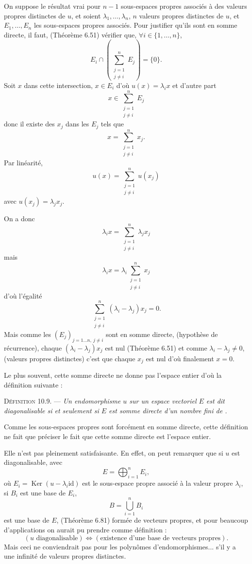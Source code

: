 On suppose le résultat vrai pour $n-1$ sous-espaces propres associés à des valeurs propres distinctes de $u$, et soient $\lambda_1,\ldots,\lambda_n$, $n$ valeurs propres distinctes de $u$, et $E_1,\ldots,E_n$ les sous-espaces propres associés. Pour justifier qu'ils sont en somme directe, il faut, (Théorème 6.51) vérifier que, $\forall i\in\{1,\ldots,n\}$,
\[
E_i\cap\left(\sum_{\substack{j=1\\j\ne i}}^nE_j\right)=\{0\}.
\]
Soit $x$ dans cette intersection, $x\in E_i$ d'où $u(x)=\lambda_ix$ et d'autre part
\[
x\in\sum_{\substack{j=1\\j\ne i}}^nE_j
\]
donc il existe des $x_j$ dans les $E_j$ tels que
\[
x=\sum_{\substack{j=1\\j\ne i}}^nx_j.
\]
Par linéarité,
\[
u(x)=\sum_{\substack{j=1\\j\ne i}}^nu(x_j)
\]
avec $u(x_j)=\lambda_jx_j$.

On a donc
\[
\lambda_ix=\sum_{\substack{j=1\\j\ne i}}^n\lambda_jx_j
\]
mais
\[
\lambda_ix=\lambda_i\sum_{\substack{j=1\\j\ne i}}^nx_j
\]
d'où l'égalité
\[
\sum_{\substack{j=1\\j\ne i}}^n(\lambda_i-\lambda_j)x_j=0.
\]
Mais comme les $(E_j)_{j=1\ldots n,\ j\ne i}$ sont en somme directe, (hypothèse de récurrence), chaque $(\lambda_i-\lambda_j)x_j$ est nul (Théorème 6.51) et comme $\lambda_i-\lambda_j\ne0$, (valeurs propres distinctes) c'est que chaque $x_j$ est nul d'où finalement $x=0$. \bookend

Le plus souvent, cette somme directe ne donne pas l'espace entier d'où la définition suivante :

\medskip\noindent\textsc{Définition 10.9.} --- \emph{Un endomorphisme $u$ sur un espace vectoriel $E$ est dit diagonalisable si et seulement si $E$ est somme directe d'un nombre fini de .}

Comme les sous-espaces propres sont forcément en somme directe, cette définition ne fait que préciser le fait que cette somme directe est l'espace entier.

Elle n'est pas pleinement satisfaisante. En effet, on peut remarquer que si $u$ est diagonalisable, avec
\[
E=\bigoplus_{i=1}^nE_i,
\]
où $E_i=\operatorname{Ker}(u-\lambda_i\mathrm{id})$ est le sous-espace propre associé à la valeur propre $\lambda_i$, si $B_i$ est une base de $E_i$,
\[
B=\bigcup_{i=1}^nB_i
\]
est une base de $E$, (Théorème 6.81) formée de vecteurs propres, et pour beaucoup d'applications on aurait pu prendre comme définition :
\[
(u\text{ diagonalisable})\Longleftrightarrow(\text{existence d'une base de vecteurs propres}).
\]
Mais ceci ne conviendrait pas pour les polynômes d'endomorphismes... s'il y a une infinité de valeurs propres distinctes.


